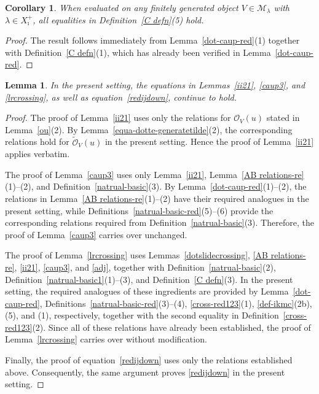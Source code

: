 \documentclass[a4,10pt]{amsart}
\numberwithin{equation}{section}
\newtheorem{Lemma}[Theorem]{Lemma}
\newtheorem{Cor}[Theorem]{Corollary}
\theoremstyle{definition}
\newcommand{\old}[1]{{\color{red} #1}}
\begin{document}
\begin{Cor}\label{def6}
When evaluated on any finitely generated object
$V\in \mathcal M_\lambda$ with $\lambda\in X_\imath^+$,
all equalities in Definition~\ref{C defn}(5) hold.
\end{Cor}
\begin{proof}
The result follows immediately from Lemma~\ref{dot-caup-red}(1) together
with Definition~\ref{C defn}(1), which has already been verified in
Lemma~\ref{dot-caup-red}.
\end{proof}
\begin{Lemma}
\label{lemmasred}
In the present setting, the equations in Lemmas~\ref{ii21}, \ref{caup3}, and \ref{lrcrossing}, as well as equation~\eqref{redijdown}, continue to hold.
\end{Lemma}

\begin{proof}
The proof of Lemma~\ref{ii21} uses only the relations for $\mathcal O_V(u)$ stated in Lemma~\ref{ou}(2). By Lemma~\ref{equa-dotte-generatetilde}(2), the corresponding relations hold for $\widetilde{\mathcal O}_V(u)$ in the present setting. Hence the proof of Lemma~\ref{ii21} applies verbatim.

The proof of Lemma~\ref{caup3} uses only Lemma~\ref{ii21}, Lemma~\ref{AB relations-re}(1)--(2), and Definition~\ref{natrual-basic}(3). By Lemma~\ref{dot-caup-red}(1)--(2), the relations in Lemma~\ref{AB relations-re}(1)--(2) have their required analogues in the present setting, while Definitions~\ref{natrual-basic-red}(5)--(6) provide the corresponding relations required from Definition~\ref{natrual-basic}(3). Therefore, the proof of Lemma~\ref{caup3} carries over unchanged.

The proof of Lemma~\ref{lrcrossing} uses Lemmas~\ref{dotslidecrossing}, \ref{AB relations-re}, \ref{ii21}, \ref{caup3}, and \ref{adj}, together with Definition~\ref{natrual-basic}(2), Definition~\ref{natrual-basic1}(1)--(3), and Definition~\ref{C defn}(3). In the present setting, the required analogues of these ingredients are provided by Lemma~\ref{dot-caup-red}, Definitions~\ref{natrual-basic-red}(3)--(4), \ref{cross-red123}(1), \ref{def-ikmc}(2b), (5), and (1), respectively, together with the second equality in Definition~\ref{cross-red123}(2). Since all of these relations have already been established, the proof of Lemma~\ref{lrcrossing} carries over without modification.

Finally, the proof of equation~\eqref{redijdown} uses only the relations established above. Consequently, the same argument proves \eqref{redijdown} in the present setting.
\end{proof}
\end{document}
